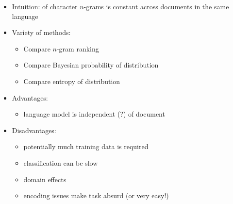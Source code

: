\documentclass[a4paper,landscape,headrule,footrule,xetex]{foils}
\begin{document}
\begin{itemize}
\item Intuition:  of character $n$-grams is constant across documents in the same language
\item Variety of methods:
\begin{itemize}
\item Compare $n$-gram ranking %
\item Compare Bayesian probability of distribution %
\item Compare entropy of distribution %
\end{itemize}
\item Advantages:
  \begin{itemize}
  \item language model is independent (?) of document
  \end{itemize}
\item Disadvantages:
  \begin{itemize}
  \item potentially much training data is required
  \item classification can be slow
  \item domain effects
  \item encoding issues make task absurd (or very easy!)
  \end{itemize}
\end{itemize}




\end{document}
